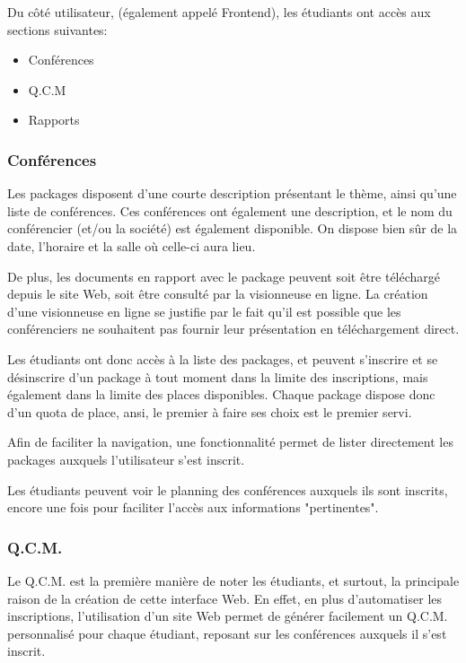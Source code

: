 Du côté utilisateur, (également appelé Frontend), les étudiants ont accès aux sections suivantes:

    \begin{itemize}
    \item Conférences
    \item Q.C.M
    \item Rapports
    \end{itemize}

            \subsubsection{Conférences}

Les packages disposent d'une courte description présentant le thème, ainsi qu'une liste de conférences.
Ces conférences ont également une description, et le nom du conférencier (et/ou la société) est également disponible.
On dispose bien sûr de la date, l'horaire et la salle où celle-ci aura lieu.

De plus, les documents en rapport avec le package peuvent soit être téléchargé depuis le site Web,
soit être consulté par la visionneuse en ligne. La création d'une visionneuse en ligne se justifie par le fait
qu'il est possible que les conférenciers ne souhaitent pas fournir leur présentation en téléchargement direct.

Les étudiants ont donc accès à la liste des packages, et peuvent s'inscrire et se désinscrire
d'un package à tout moment dans la limite des inscriptions, mais également dans la limite des places disponibles.
Chaque package dispose donc d'un quota de place, ansi, le premier à faire ses choix est le premier servi.

Afin de faciliter la navigation, une fonctionnalité permet de lister directement les packages auxquels l'utilisateur
s'est inscrit.

Les étudiants peuvent voir le planning des conférences auxquels ils sont inscrits, encore une fois pour faciliter l'accès
aux informations "pertinentes".

            \subsubsection{Q.C.M.}

Le Q.C.M. est la première manière de noter les étudiants, et surtout, la principale raison de la création de cette interface Web.
En effet, en plus d'automatiser les inscriptions, l'utilisation d'un site Web permet de générer facilement un Q.C.M.
personnalisé pour chaque étudiant, reposant sur les conférences auxquels il s'est inscrit.

